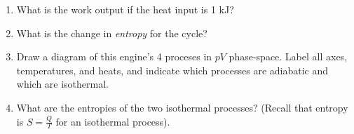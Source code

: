 \documentclass[10pt]{article}
\begin{document}
\begin{enumerate}
\begin{enumerate}
\item What is the work output if the heat input is 1 kJ? \\ \vspace{2cm}
\item What is the change in \textit{entropy} for the cycle? \\ \vspace{2cm}
\item Draw a diagram of this engine's 4 proceses in $pV$ phase-space.  Label all axes, temperatures, and heats, and indicate which processes are adiabatic and which are isothermal. \\ \vspace{4cm}
\item What are the entropies of the two isothermal processes? (Recall that entropy is $S = \frac{Q}{T}$ for an isothermal process).
\end{enumerate}
\end{enumerate}
\end{document}
